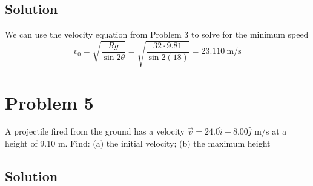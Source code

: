 \documentclass{article}
\begin{document}
\subsection*{Solution}
We can use the velocity equation from Problem 3 to solve for the minimum speed
\[
	v_0 = \sqrt{\frac{Rg}{\sin 2\theta}} = \sqrt{\frac{32\cdot 9.81}{\sin 2(18)}} = \boxed{23.110\ \text{m/s}}
\]

\section*{Problem 5}
A projectile fired from the ground has a velocity $\vec{v} = 24.0 \hat i - 8.00 \hat j$ m/s at a height of
9.10 m. Find: (a) the initial velocity; (b) the maximum height

\subsection*{Solution}
\end{document}
